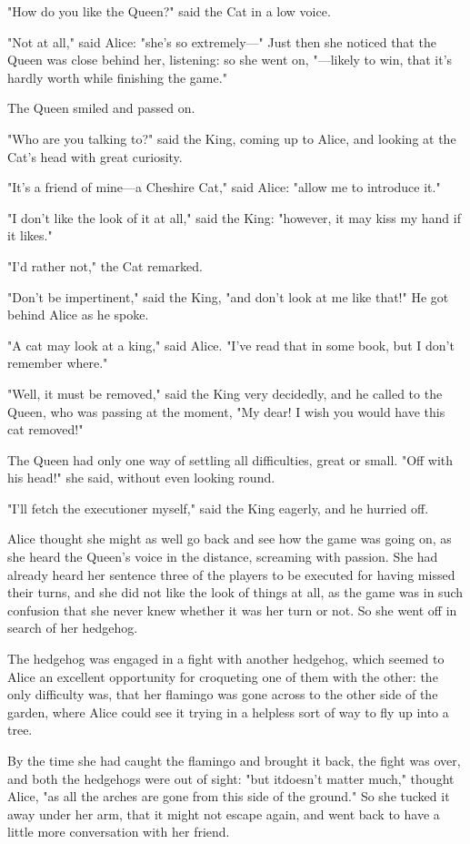 "How do you like the Queen?" said the Cat in a low voice.

"Not at all," said Alice: "she's so extremely—" Just then she noticed that the Queen was close behind her, listening: so she went on, "—likely to win, that it's hardly worth while finishing the game."

The Queen smiled and passed on.

​"Who are you talking to?" said the King, coming up to Alice, and looking at the Cat's head with great curiosity.

"It's a friend of mine—a Cheshire Cat," said Alice: "allow me to introduce it."

"I don't like the look of it at all," said the King: "however, it may kiss my hand if it likes."

"I'd rather not," the Cat remarked.

"Don't be impertinent," said the King, "and don't look at me like that!" He got behind Alice as he spoke.

"A cat may look at a king," said Alice. "I've read that in some book, but I don't remember where."

"Well, it must be removed," said the King very decidedly, and he called to the Queen, who was passing at the moment, "My dear! I wish you would have this cat removed!"

The Queen had only one way of settling all difficulties, great or small. "Off with his head!" she said, without even looking round.

​"I'll fetch the executioner myself," said the King eagerly, and he hurried off.

Alice thought she might as well go back and see how the game was going on, as she heard the Queen's voice in the distance, screaming with passion. She had already heard her sentence three of the players to be executed for having missed their turns, and she did not like the look of things at all, as the game was in such confusion that she never knew whether it was her turn or not. So she went off in search of her hedgehog.

The hedgehog was engaged in a fight with another hedgehog, which seemed to Alice an excellent opportunity for croqueting one of them with the other: the only difficulty was, that her flamingo was gone across to the other side of the garden, where Alice could see it trying in a helpless sort of way to fly up into a tree.

By the time she had caught the flamingo and brought it back, the fight was over, and both the hedgehogs were out of sight: "but it ​doesn't matter much," thought Alice, "as all the arches are gone from this side of the ground." So she tucked it away under her arm, that it might not escape again, and went back to have a little more conversation with her friend.

